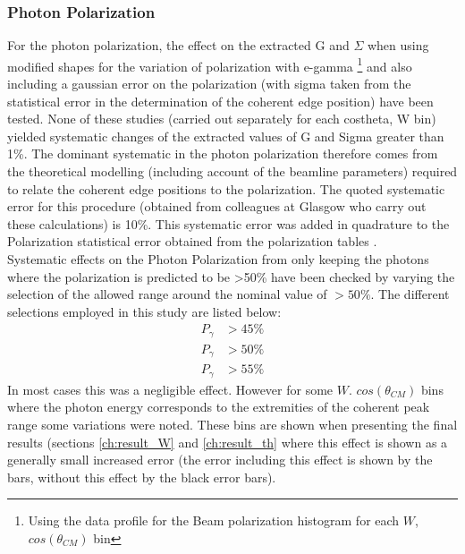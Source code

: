 \subsubsection{Photon Polarization}\label{sec:ph_pol_sys}
For the photon polarization, the effect on the extracted G and $\Sigma$ when using modified shapes for the variation of polarization with e-gamma \footnote{Using the data profile for the Beam polarization histogram for each $W$, $cos(\theta_{CM})$ bin} and also including a gaussian error on the polarization (with sigma taken from the statistical error in the determination of the coherent edge position) have been tested. None of these studies (carried out separately for each costheta, W bin) yielded systematic changes of the extracted values of G and Sigma greater than 1\%. The dominant systematic in the photon polarization therefore comes from the theoretical modelling (including account of the beamline parameters) required to relate the coherent edge positions to the polarization. The quoted systematic error for this procedure (obtained from colleagues at Glasgow who carry out these calculations) is 10\%.
 This systematic error was added in quadrature to the Polarization statistical error obtained from the polarization tables \cite{Anderson_table}. \\
Systematic effects on the Photon Polarization from only keeping the photons where the polarization is predicted to be >50\%  have been checked by varying the selection of the allowed range around the nominal value of $>50\%$. The different selections employed in this study are listed below: 
\begin{align}
  P_\gamma &> 45 \% \\
  P_\gamma &> 50 \% \\
  P_\gamma &> 55 \% 
\end{align}
In most cases this was a negligible effect. However for some $W$. $cos(\theta_{CM})$ bins where the photon energy corresponds to the extremities of the coherent peak range some variations were noted. These bins are shown when presenting the final results (sections \ref{ch:result_W} and \ref{ch:result_th} where this effect is shown as a generally small increased error (the error including this effect is shown by the \color{red}{red} \color{black}{error} bars, without this effect by the black error bars). 


